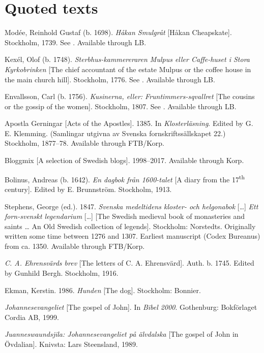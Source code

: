 \documentclass[output=paper]{langscibook}
\begin{document}
\section*{Quoted texts}
\begin{description}[font=\normalfont]\sloppy
\item[1dSMUL:] Modée, Reinhold Gustaf (b. 1698). \textit{Håkan Smulgråt} [Håkan Cheapskate]. Stockholm, 1739. See  \citet{MarttalaStromquist2001}. Available through LB.
\item[2aSTERBH:] Kexél, Olof (b. 1748). \textit{Sterbhus-kammereraren Mulpus eller Caffe-huset i Stora Kyrkobrinken} [The chief accountant of the estate Mulpus or the coffee house in the main church hill]. Stockholm, 1776. See \citet{MarttalaStromquist2001}. Available through LB.
\item[2cKUSINE:] Envallsson, Carl (b. 1756). \textit{Kusinerna, eller: Fruntimmers-sqvallret} [The cousins or the gossip of the women]. Stockholm, 1807. See \citet{MarttalaStromquist2001}. Available through LB.
\item[ApG:] Apostla Gerningar [Acts of the Apostles]. 1385. In \textit{Klosterläsning}. Edited by G. E. Klemming. (Samlingar utgivna av Svenska fornskriftssällskapet 22.) Stockholm, 1877–78. Available through FTB\slash Korp.
\item[Blogg:] Bloggmix [A selection of Swedish blogs]. 1998–2017. Available through Korp.
\item[Bol:] Bolinus, Andreas (b. 1642). \textit{En dagbok från 1600-talet} [A diary from the 17\textsuperscript{th} century]. Edited by E. Brunnström. Stockholm, 1913. 
\item[Leg:] Stephens, George (ed.). 1847. \textit{Svenska medeltidens kloster- och helgonabok} […] \textit{Ett forn-svenskt legendarium} […] [The Swedish medieval book of monasteries and saints … An Old Swedish collection of legends]. Stockholm: Norstedts. Originally written some time between 1276 and 1307. Earliest manuscript (Codex Bureanus) from ca. 1350. Available through FTB\slash Korp.
\item[Ehrensvärd:] \textit{C. A. Ehrensvärds brev} [The letters of C. A. Ehrensvärd]. Auth. b. 1745. Edited by Gunhild Bergh. Stockholm, 1916.
\item[Hunden:] Ekman, Kerstin. 1986. \textit{Hunden} [The dog]. Stockholm: Bonnier. 
\item[Joh.:] \textit{Johannesevangeliet} [The gospel of John]. In \textit{Bibel 2000}. Gothenburg: Bokförlaget Cordia AB, 1999. 
\item[Jua.:] \textit{Juanneswaundsjila: Johannesevangeliet på älvdalska} [The gospel of John in Övdalian]. Knivsta: Lars Steensland, 1989.

\end{description}
\end{document}
